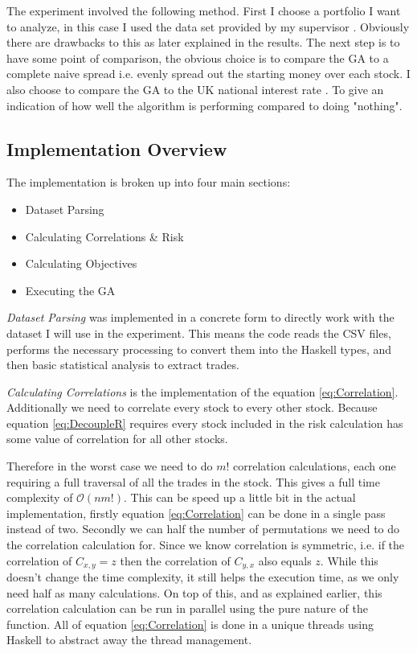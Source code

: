 \documentclass[11pt]{article}
\newcommand{\bigO}{\mathcal{O}}
\begin{document}
    The experiment involved the following method. First I choose a portfolio I want to
    analyze, in this case I used the data set provided by my supervisor \cite{Dataset}.
    Obviously there are drawbacks to this as later explained in the results. The next step is
    to have some point of comparison, the obvious choice is to compare the GA to
    a complete naive spread i.e. evenly spread out the starting money over each stock.
    I also choose to compare the GA to the UK national interest rate \cite{BankOfE} . To give an
    indication of how well the algorithm is performing compared to doing "nothing".

\subsection{Implementation Overview}

    The implementation is broken up into four main sections:

    \begin{itemize}
        \item{Dataset Parsing}
        \item{Calculating Correlations \& Risk}
        \item{Calculating Objectives}
        \item{Executing the GA}
    \end{itemize}

    \textit{Dataset Parsing} was implemented in a concrete form to directly work with the
    dataset I will use in the experiment. This means the code reads the CSV files,
    performs the necessary processing to convert them into the Haskell types, and then
    basic statistical analysis to extract trades.

    \textit{Calculating Correlations} is the implementation of the equation \ref{eq:Correlation}.
    Additionally we need to correlate every stock to every other stock. Because equation
    \ref{eq:DecoupleR} requires every stock included in the risk calculation has some value of
    correlation for all other stocks.

    Therefore in the worst case we need to do \(m!\) correlation calculations, each one requiring a
    full traversal of all the trades in the stock. This gives a full time complexity of 
    \(\bigO (nm!) \). This can be speed up a little bit in the actual implementation, firstly
    equation \ref{eq:Correlation} can be done in a single pass instead of two. Secondly we can
    half the number of permutations we need to do the correlation calculation for. Since we know
    correlation is symmetric, i.e. if the correlation of \(C_{x,y} = z\) then the correlation
    of \(C_{y,x}\) also equals \(z\). While this doesn't change the time complexity, it still helps
    the execution time, as we only need half as many calculations. On top of this, and as explained
    earlier, this correlation calculation can be run in parallel using the pure nature of the function.
    All of equation \ref{eq:Correlation} is done in a unique threads using Haskell to abstract away
    the thread management.
\end{document}
